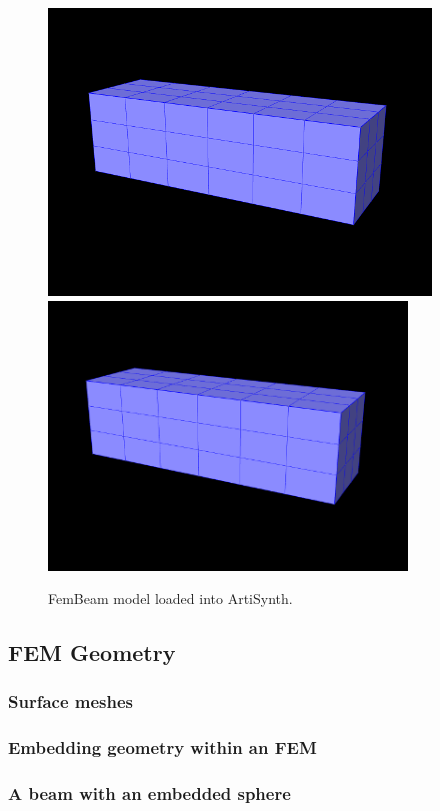 \begin{figure}[ht]
\begin{center}
\iflatexml
 \includegraphics[]{images/FemBeam}
\else
 \includegraphics[width=3.75in]{images/FemBeam}
\fi
\end{center}
\caption{FemBeam model loaded into ArtiSynth.}
\label{FemBeam:fig}
\end{figure}

\subsection{FEM Geometry}

\subsubsection{Surface meshes}

\subsubsection{Embedding geometry within an FEM}

\subsubsection{A beam with an embedded sphere}

